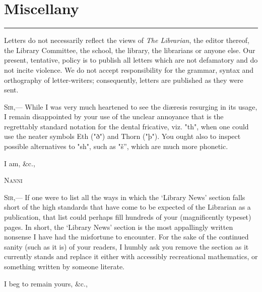 \chapter{Miscellany}

\begin{multicols}{2}

\setlength{\parskip}{0em}
\tableofcontents
\setlength{\parskip}{1.2em}

\vspace{1.2em}
\hrule{\linewidth}

\vspace{0.55em}

Letters do not necessarily reflect the views of \textit{The Librarian}, the editor thereof, the Library Committee, the school, the library, the librarians or anyone else. Our present, tentative, policy is to publish all letters which are not defamatory and do not incite violence. We do not accept responsibility for the grammar, syntax and orthography of letter-writers; consequently, letters are published as they were sent.

\textsc{Sir},---
While I was very much heartened to see the diæresis resurging in its usage, I remain disappointed by your use of the unclear annoyance that is the regrettably standard notation for the dental fricative, viz. "th", when one could use the neater symbols Eth ("ð") and Thorn ("þ"). You ought also to inspect possible alternatives to "sh", such as "š”, which are much more phonetic.

\vspace{-1.2em}
\hspace{0.1\linewidth}I am, \&c.,
\vspace{-1.2em}

\hspace{\fill}\textsc{Nanni}

\textsc{Sir},---
If one were to list all the ways in which the ‘Library News’ section falls short of the high standards that have come to be expected of the Librarian as a publication, that list could perhaps fill hundreds of your (magnificently typeset) pages. In short, the ‘Library News’ section is the most appallingly written nonsense I have had the misfortune to encounter. For the sake of the continued sanity (such as it is) of your readers, I humbly ask you remove the section as it currently stands and replace it either with accessibly recreational mathematics, or something written by someone literate.

\vspace{-1.2em}
\hspace{0.1\linewidth}I beg to remain yours, \&c.,
\vspace{-1.2em}


\end{multicols}

